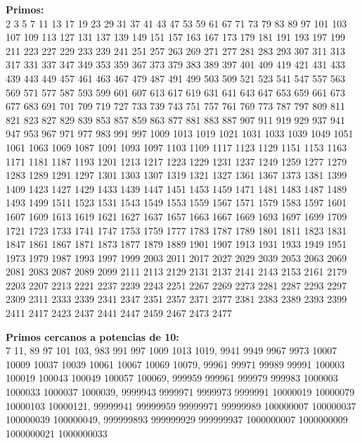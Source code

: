 \documentclass[10pt,landscape,twocolumn,letterpaper,twosided]{article}
\begin{document}
{{					\textbf{Primos:}\\
					\vspace{3mm}
					2 3 5 7 11 13 17 19 23 29 31 37 41 43 47 53 59 61 67 71 73 79 83 89 97 101 103 107 109 113 127 131 137 139
					149 151 157 163 167 173 179 181 191 193 197 199 211 223 227 229 233 239 241 251 257 263 269 271 277 281 283
					293 307 311 313 317 331 337 347 349 353 359 367 373 379 383 389 397 401 409 419 421 431 433 439 443 449 457
					461 463 467 479 487 491 499 503 509 521 523 541 547 557 563 569 571 577 587 593 599 601 607 613 617 619 631
					641 643 647 653 659 661 673 677 683 691 701 709 719 727 733 739 743 751 757 761 769 773 787 797 809 811 821
					823 827 829 839 853 857 859 863 877 881 883 887 907 911 919 929 937 941 947 953 967 971 977 983 991 997
					1009 1013 1019 1021 1031 1033 1039 1049 1051 1061 1063 1069 1087 1091 1093 1097 1103 1109 1117 1123 1129
					1151 1153 1163 1171 1181 1187 1193 1201 1213 1217 1223 1229 1231 1237 1249 1259 1277 1279 1283 1289 1291
					1297 1301 1303 1307 1319 1321 1327 1361 1367 1373 1381 1399 1409 1423 1427 1429 1433 1439 1447 1451 1453
					1459 1471 1481 1483 1487 1489 1493 1499 1511 1523 1531 1543 1549 1553 1559 1567 1571 1579 1583 1597 1601
					1607 1609 1613 1619 1621 1627 1637 1657 1663 1667 1669 1693 1697 1699 1709 1721 1723 1733 1741 1747 1753 
					1759 1777 1783 1787 1789 1801 1811 1823 1831 1847 1861 1867 1871 1873 1877 1879 1889 1901 1907 1913 1931 
					1933 1949 1951 1973 1979 1987 1993 1997 1999 2003 2011 2017 2027 2029 2039 2053 2063 2069 2081 2083 2087 
					2089 2099 2111 2113 2129 2131 2137 2141 2143 2153 2161 2179 2203 2207 2213 2221 2237 2239 2243 2251 2267 
					2269 2273 2281 2287 2293 2297 2309 2311 2333 2339 2341 2347 2351 2357 2371 2377 2381 2383 2389 2393 2399 
					2411 2417 2423 2437 2441 2447 2459 2467 2473 2477

					\vspace{8mm}
					\textbf{Primos cercanos a potencias de 10:}\\
					\vspace{3mm}
					7 11, 89 97 101 103, 983 991 997 1009 1013 1019, 
					9941 9949 9967 9973 10007 10009 10037 10039 10061 10067 10069 10079, 
					99961 99971 99989 99991 100003 100019 100043 100049 100057 100069, 
					999959 999961 999979 999983 1000003 1000033 1000037 1000039,
					9999943 9999971 9999973 9999991 10000019 10000079 10000103 10000121,
					99999941 99999959 99999971 99999989 100000007 100000037 100000039 100000049,
					999999893 999999929 999999937 1000000007 1000000009 1000000021 1000000033
					
}}
\end{document}
